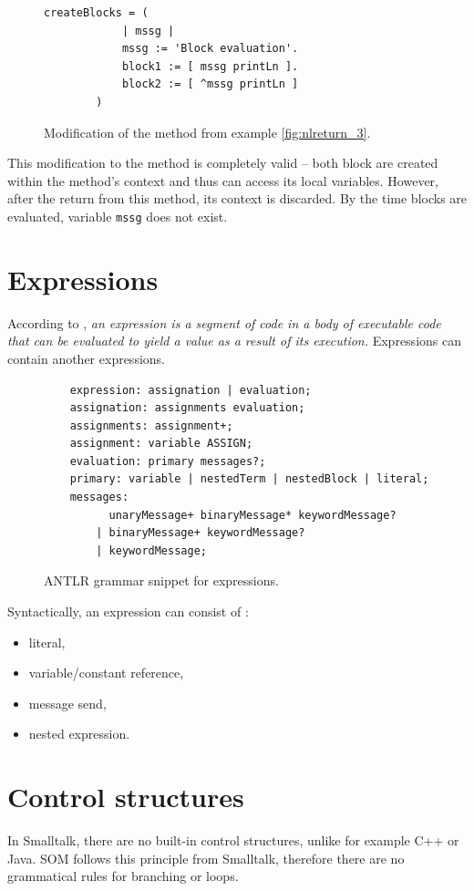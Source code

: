 \documentclass[thesis=M,english]{FITthesis}[2019/12/23]
\begin{document}
\begin{figure}[h!]
	\centering
	\begin{lstlisting}[language=Smalltalk]
		createBlocks = (
			| mssg |
			mssg := 'Block evaluation'.
			block1 := [ mssg printLn ].
			block2 := [ ^mssg printLn ]
		)
	\end{lstlisting}
	\caption{Modification of the method from example \ref{fig:nlreturn_3}.}
	\label{fig:nlreturn_3_2}
\end{figure}

This modification to the method is completely valid -- both block are created within the method's context and thus
can access its local variables. However, after the return from this method, its context is discarded. By the time
blocks are evaluated, variable \texttt{mssg} does not exist.

\section{Expressions}
According to \cite{smalltalk-essentials}, \textit{an expression is a segment of code in a body of executable code
that can be evaluated to yield a value as a result of its execution.} Expressions can contain another expressions.

\begin{figure}[h!]
	\begin{verbatim}
	expression: assignation | evaluation;
	assignation: assignments evaluation;
	assignments: assignment+;
	assignment: variable ASSIGN;
	evaluation: primary messages?;
	primary: variable | nestedTerm | nestedBlock | literal;
	messages:
		  unaryMessage+ binaryMessage* keywordMessage?
		| binaryMessage+ keywordMessage?
		| keywordMessage;
	\end{verbatim}
	\caption{ANTLR grammar snippet for expressions.}
	\label{fig:grammar_exp}
\end{figure}

Syntactically, an expression can consist of \cite{smalltalk-essentials}:
\begin{itemize}
	\item literal,
	\item variable/constant reference,
	\item message send,
	\item nested expression.
\end{itemize}

\section{Control structures}
In Smalltalk, there are no built-in control structures, unlike for example C++ or Java. SOM follows this principle
from Smalltalk, therefore there are no grammatical rules for branching or loops.
\end{document}
